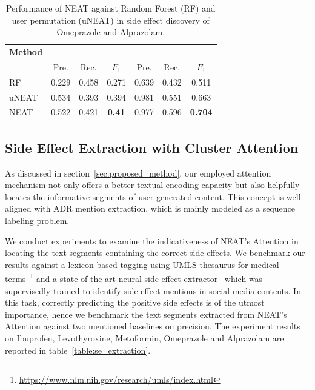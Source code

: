 \documentclass{bmcart}
\begin{document}
\begin{table}[t!]
  \captionsetup{justification=centering}
  \centering
  \scalebox{1.2}
  \footnotesize
  \begin{tabular}{l||c|c|c|c|c|c}
    \hline
    \textbf{Method} &
    \multicolumn{3}{c|}{\centering{Omeprazole}} &
    \multicolumn{3}{c}{\centering{Alprazolam}}\\
    & Pre. & Rec. & $F_1$ & Pre. & Rec. & $F_1$ \\ \hline \hline
    RF & 0.229 & 0.458 & 0.271 & 0.639 & 0.432 & 0.511 \\ \hline
    uNEAT & 0.534 & 0.393 & 0.394 & 0.981 & 0.551 & 0.663 \\ \hline
    NEAT & 0.522 & 0.421 & \textbf{0.41} & 0.977 & 0.596 & \textbf{0.704} \\ \hline
  \end{tabular}
  \caption{Performance of NEAT against Random Forest (RF) and user permutation (uNEAT) in side effect discovery of Omeprazole and Alprazolam.}\label{table:se_discovery2}
\end{table}

\subsection{Side Effect Extraction with Cluster Attention}\label{subsec:se_extraction}
As discussed in section~\ref{sec:proposed_method}, our employed attention mechanism not only offers a better textual encoding capacity but also helpfully locates the informative segments of user-generated content. This concept is well-aligned with ADR mention extraction, which is mainly modeled as a sequence labeling problem.

We conduct experiments to examine the indicativeness of NEAT's Attention in locating the text segments containing the correct side effects. We benchmark our results against a lexicon-based tagging using UMLS thesaurus for medical terms~\footnote{\scriptsize{\url{https://www.nlm.nih.gov/research/umls/index.html}}} and a state-of-the-art neural side effect extractor~\cite{ding2018attentive} which was supervisedly trained to identify side effect mentions in social media contents. In this task, correctly predicting the positive side effects is of the utmost importance, hence we benchmark the text segments extracted from NEAT's Attention against two mentioned baselines on precision. The experiment results on Ibuprofen, Levothyroxine, Metoformin, Omeprazole and Alprazolam are reported in table~\ref{table:se_extraction}.
\end{document}
